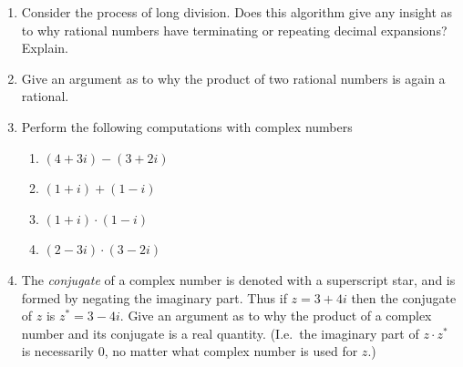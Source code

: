 \begin{enumerate}
{You can get sage to output $\pi$ to high accuracy by typing {\tt pi.n(digits=21)}
at the sage$>$ prompt.}

\vfill

\workbookpagebreak
 
\item Consider the process of long division.  Does this algorithm give
any insight as to why rational numbers have terminating or repeating
decimal expansions?  Explain.


\vfill

\item Give an argument as to why the product of two rational numbers
is again a rational.


\vfill

\textbookpagebreak

\hintspagebreak

\item Perform the following computations with complex numbers

  \begin{enumerate}
  \item \rule{0pt}{20pt}$ (4 + 3i) - (3 + 2i) $
  \item \rule{0pt}{20pt}$ (1 + i) + (1 - i) $
  \item \rule{0pt}{20pt}$ (1 + i) \cdot (1 - i) $
  \item \rule{0pt}{20pt}$ (2 - 3i) \cdot (3 - 2i) $
  \end{enumerate}


\workbookpagebreak

\item The {\em conjugate} of a complex number is denoted with a
  superscript star, and is formed by negating the imaginary part.
  Thus if $z = 3+ 4i$ then the conjugate of $z$ is  $z^\ast = 3-4i$.
  Give an argument as to why the product of a complex number and its
  conjugate is a real quantity.  (I.e.\ the imaginary part of
  $z\cdot z^\ast$ is necessarily 0, no matter what complex number is
  used for $z$.) 


\end{enumerate}
